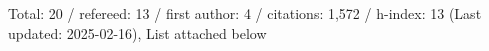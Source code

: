 Total: 20 / refereed: 13 / first author: 4 / citations: 1,572 / h-index: 13 (Last updated: 2025-02-16), List attached below